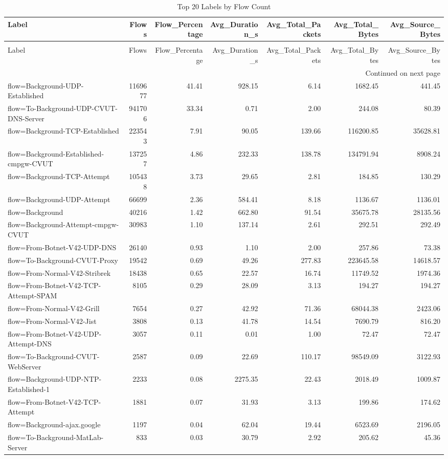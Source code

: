 \begin{longtable}{lrrrrrr}
\caption{Top 20 Labels by Flow Count} \label{tab:label_summary} \\
\toprule
Label & Flows & Flow\_Percentage & Avg\_Duration\_s & Avg\_Total\_Packets & Avg\_Total\_Bytes & Avg\_Source\_Bytes \\
\midrule
\endfirsthead
\caption[]{Top 20 Labels by Flow Count} \\
\toprule
Label & Flows & Flow\_Percentage & Avg\_Duration\_s & Avg\_Total\_Packets & Avg\_Total\_Bytes & Avg\_Source\_Bytes \\
\midrule
\endhead
\midrule
\multicolumn{7}{r}{Continued on next page} \\
\midrule
\endfoot
\bottomrule
\endlastfoot
flow=Background-UDP-Established & 1169677 & 41.41 & 928.15 & 6.14 & 1682.45 & 441.45 \\
flow=To-Background-UDP-CVUT-DNS-Server & 941706 & 33.34 & 0.71 & 2.00 & 244.08 & 80.39 \\
flow=Background-TCP-Established & 223543 & 7.91 & 90.05 & 139.66 & 116200.85 & 35628.81 \\
flow=Background-Established-cmpgw-CVUT & 137257 & 4.86 & 232.33 & 138.78 & 134791.94 & 8908.24 \\
flow=Background-TCP-Attempt & 105438 & 3.73 & 29.65 & 2.81 & 184.85 & 130.29 \\
flow=Background-UDP-Attempt & 66699 & 2.36 & 584.41 & 8.18 & 1136.67 & 1136.01 \\
flow=Background & 40216 & 1.42 & 662.80 & 91.54 & 35675.78 & 28135.56 \\
flow=Background-Attempt-cmpgw-CVUT & 30983 & 1.10 & 137.14 & 2.61 & 292.51 & 292.49 \\
flow=From-Botnet-V42-UDP-DNS & 26140 & 0.93 & 1.10 & 2.00 & 257.86 & 73.38 \\
flow=To-Background-CVUT-Proxy & 19542 & 0.69 & 49.26 & 277.83 & 223645.58 & 14618.57 \\
flow=From-Normal-V42-Stribrek & 18438 & 0.65 & 22.57 & 16.74 & 11749.52 & 1974.36 \\
flow=From-Botnet-V42-TCP-Attempt-SPAM & 8105 & 0.29 & 28.09 & 3.13 & 194.27 & 194.27 \\
flow=From-Normal-V42-Grill & 7654 & 0.27 & 42.92 & 71.36 & 68044.38 & 2423.06 \\
flow=From-Normal-V42-Jist & 3808 & 0.13 & 41.78 & 14.54 & 7690.79 & 816.20 \\
flow=From-Botnet-V42-UDP-Attempt-DNS & 3057 & 0.11 & 0.01 & 1.00 & 72.47 & 72.47 \\
flow=To-Background-CVUT-WebServer & 2587 & 0.09 & 22.69 & 110.17 & 98549.09 & 3122.93 \\
flow=Background-UDP-NTP-Established-1 & 2233 & 0.08 & 2275.35 & 22.43 & 2018.49 & 1009.87 \\
flow=From-Botnet-V42-TCP-Attempt & 1881 & 0.07 & 31.93 & 3.13 & 199.86 & 174.62 \\
flow=Background-ajax.google & 1197 & 0.04 & 62.04 & 19.44 & 6523.69 & 2196.05 \\
flow=To-Background-MatLab-Server & 833 & 0.03 & 30.79 & 2.92 & 205.62 & 45.36 \\
\end{longtable}
